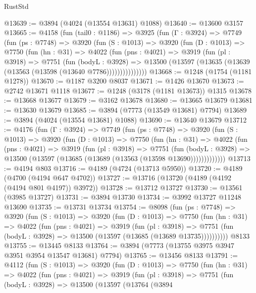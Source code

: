 \begin{lexlean}{RustStd}
\begin{coremodule}
@13639 := @3894 (@4024 (@13554 @13631) @1088)
@13640 := @13600 @3157
@13665 := @4158
    (fun (tail0 : @1186) =>
    @3925
      (fun (Γ : @3924) =>
      @7749
        (fun (ps : @7748) =>
        @3920
          (fun (S : @1013) =>
          @3920
            (fun (D : @1013) =>
            @7750
              (fun (hn : @31) =>
              @4022
                (fun (pns : @4021) =>
                @3919
                  (fun (pl : @3918) =>
                  @7751
                    (fun (bodyL : @3928) =>
                    @13500 (@13597 (@13635 (@13639 (@13563 (@13598 (@13640 @7786)))))))))))))))
@13668 := @1248 (@1754 (@1181 @1278))
@13670 := @1187 @3200 @8037
@13671 := @1426 @13670
@13673 := @2742 @13671 @1118
@13677 := @1248 (@3178 (@1181 @13673)) @1315
@13678 := @13668 @13677
@13679 := @3162 @13678
@13680 := @13665 @13679
@13681 := @13630 @13679
@13685 := @3894 (@7773 (@13549 @13681) @7794)
@13689 := @3894 (@4024 (@13554 @13681) @1088)
@13690 := @13640 @13679
@13712 := @4176
    (fun (Γ : @3924) =>
    @7749
      (fun (ps : @7748) =>
      @3920
        (fun (S : @1013) =>
        @3920
          (fun (D : @1013) =>
          @7750
            (fun (hn : @31) =>
            @4022
              (fun (pns : @4021) =>
              @3919
                (fun (pl : @3918) =>
                @7751
                  (fun (bodyL : @3928) =>
                  @13500 (@13597 (@13685 (@13689 (@13563 (@13598 @13690)))))))))))))
@13713 := @4194 @803
@13716 := @4189 (@4724 (@13713 @5950))
@13720 := @4189 (@4700 (@4194 @647 @4702))
@13727 := @13716 (@13720 (@4189 (@4192 (@4194 @801 @4197)) @3972))
@13728 := @13712 @13727
@13730 := @13561 (@3985 @13727)
@13731 := @3894 @13730
@13734 := @3992 @13727 @11248 @13690
@13735 := @13731 @13734
@13754 := @8098
    (fun (ps : @7748) =>
    @3920
      (fun (S : @1013) =>
      @3920
        (fun (D : @1013) =>
        @7750
          (fun (hn : @31) =>
          @4022
            (fun (pns : @4021) =>
            @3919
              (fun (pl : @3918) =>
              @7751 (fun (bodyL : @3928) => @13500 (@13597 (@13685 (@13689 @13735))))))))))
    @8133
@13755 := @13445 @8133
@13764 := @3894 (@7773 (@13755 @3975 @3947 @3951 @3954 @13547 @13681) @7794)
@13765 := @13456 @8133
@13791 := @4112
    (fun (S : @1013) =>
    @3920
      (fun (D : @1013) =>
      @7750
        (fun (hn : @31) =>
        @4022
          (fun (pns : @4021) =>
          @3919
            (fun (pl : @3918) =>
            @7751
              (fun (bodyL : @3928) =>
              @13500
                (@13597
                  (@13764
                    (@3894

\end{coremodule}
\end{lexlean}

